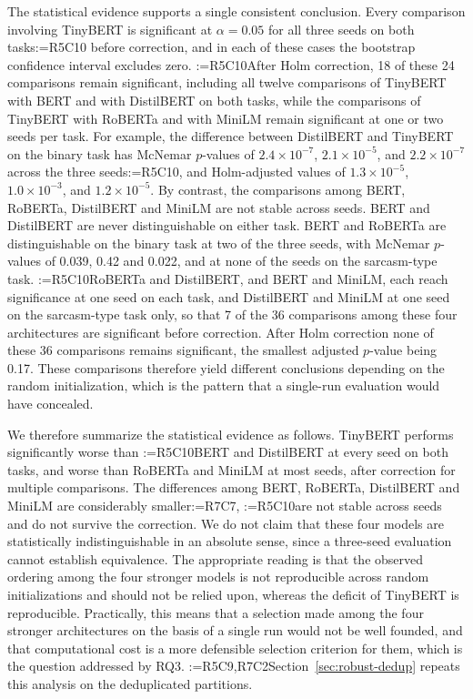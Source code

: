 \documentclass[a4paper,fleqn]{cas-sc}
\makeatletter
\newif\iftracked
\newcommand{\rv@setcolour}[1]{%
  \IfStrEq{#1}{R7C7}{\color{rvEdit}}{%
    \IfSubStr{#1}{R5}{\IfSubStr{#1}{R7}{\color{rvBoth}}{\color{rvFive}}}{\color{rvSeven}}}}
\newcommand{\rv@tag}[1]{\textsuperscript{\sffamily\bfseries\scriptsize[\StrSubstitute{#1}{,}{, }]}\,}
\newcommand{\rv@recordone}[1]{%
  \edef\rv@i{#1}%
  \ifcsdef{rv@n@\rv@i}{}{\csgdef{rv@n@\rv@i}{0}}%
  \csxdef{rv@n@\rv@i}{\the\numexpr\csuse{rv@n@\rv@i}+1\relax}%
  \begingroup\edef\@currentlabel{\rv@i}\label{rv:\rv@i:\csuse{rv@n@\rv@i}}\endgroup}
\newcommand{\rv@record}[1]{\@for\rv@id:=#1\do{\expandafter\rv@recordone\expandafter{\rv@id}}}
\DeclareRobustCommand{\rc}[2]{\rv@record{#1}\iftracked{\rv@setcolour{#1}\rv@tag{#1}#2}\else#2\fi}
\DeclareRobustCommand{\rcrep}[3]{\rv@record{#1}\iftracked{\rv@setcolour{#1}\rv@tag{#1}\rv@strike{#2} #3}\else#3\fi}
\DeclareRobustCommand{\rce}[1]{\rv@record{R7C7}\iftracked{\color{rvEdit}#1}\else#1\fi}
\makeatother
\begin{document}
The statistical evidence supports a single consistent conclusion. Every comparison involving TinyBERT is significant at $\alpha = 0.05$ for all three seeds on both tasks\rc{R5C10}{ before correction}, and in each of these cases the bootstrap confidence interval excludes zero. \rc{R5C10}{After Holm correction, 18 of these 24 comparisons remain significant, including all twelve comparisons of TinyBERT with BERT and with DistilBERT on both tasks, while the comparisons of TinyBERT with RoBERTa and with MiniLM remain significant at one or two seeds per task.} For example, the difference between DistilBERT and TinyBERT on the binary task has McNemar $p$-values of $2.4\times10^{-7}$, $2.1\times10^{-5}$, and $2.2\times10^{-7}$ across the three seeds\rc{R5C10}{, and Holm-adjusted values of $1.3\times10^{-5}$, $1.0\times10^{-3}$, and $1.2\times10^{-5}$}. By contrast, the comparisons among BERT, RoBERTa, DistilBERT and MiniLM are not stable across seeds. BERT and DistilBERT are never distinguishable on either task. BERT and RoBERTa are distinguishable on the binary task at two of the three seeds, with McNemar $p$-values of 0.039, 0.42 and 0.022, and at none of the seeds on the sarcasm-type task. \rcrep{R5C10}{BERT and MiniLM, and DistilBERT and MiniLM, each reach significance at one seed of three on the binary task.}{RoBERTa and DistilBERT, and BERT and MiniLM, each reach significance at one seed on each task, and DistilBERT and MiniLM at one seed on the sarcasm-type task only, so that 7 of the 36 comparisons among these four architectures are significant before correction. After Holm correction none of these 36 comparisons remains significant, the smallest adjusted $p$-value being 0.17.} These comparisons therefore yield different conclusions depending on the random initialization, which is the pattern that a single-run evaluation would have concealed.

We therefore summarize the statistical evidence as follows. TinyBERT performs significantly worse than \rcrep{R5C10}{each of the four stronger architectures, and this holds at every seed on both tasks}{BERT and DistilBERT at every seed on both tasks, and worse than RoBERTa and MiniLM at most seeds, after correction for multiple comparisons}. The differences among BERT, RoBERTa, DistilBERT and MiniLM are considerably smaller\rce{,} \rcrep{R5C10}{and are not stable across seeds. Some of these comparisons do reach significance at individual seeds, and we}{are not stable across seeds and do not survive the correction. We} do not claim that these four models are statistically indistinguishable in an absolute sense, since a three-seed evaluation cannot establish equivalence. The appropriate reading is that the observed ordering among the four stronger models is not reproducible across random initializations and should not be relied upon, whereas the deficit of TinyBERT is reproducible. Practically, this means that a selection made among the four stronger architectures on the basis of a single run would not be well founded, and that computational cost is a more defensible selection criterion for them, which is the question addressed by RQ3. \rc{R5C9,R7C2}{Section~\ref{sec:robust-dedup} repeats this analysis on the deduplicated partitions.}
\end{document}
